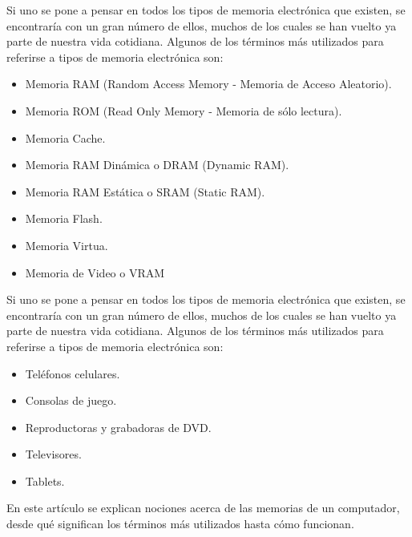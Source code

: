 \documentclass{article}
\begin{document}
Si uno se pone a pensar en todos los tipos de memoria electrónica que existen, se encontraría
con un gran número de ellos, muchos de los cuales se han vuelto ya parte de nuestra vida
cotidiana. Algunos de los términos más utilizados para referirse a tipos de memoria electrónica
son:
\begin{itemize}
\item Memoria RAM (Random Access Memory - Memoria de Acceso Aleatorio).
\item Memoria ROM (Read Only Memory - Memoria de sólo lectura).
\item Memoria Cache.
\item Memoria RAM Dinámica o DRAM (Dynamic RAM).
\item Memoria RAM Estática o SRAM (Static RAM).
\item Memoria Flash.
\item Memoria Virtua.
\item Memoria de Video o VRAM
\end{itemize}
Si uno se pone a pensar en todos los tipos de memoria electrónica que existen, se encontraría
con un gran número de ellos, muchos de los cuales se han vuelto ya parte de nuestra vida
cotidiana. Algunos de los términos más utilizados para referirse a tipos de memoria electrónica
son:
\begin{itemize}
\item Teléfonos celulares.
\item Consolas de juego.
\item Reproductoras y grabadoras de DVD.
\item Televisores.
\item Tablets.
\end{itemize}
En este artículo se explican nociones acerca de las memorias de un computador, desde qué
significan los términos más utilizados hasta cómo funcionan.
\end{document}
